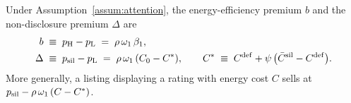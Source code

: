\label{lem:att_prices}
Under Assumption~\ref{assum:attention}, the energy-efficiency premium $b$ and the non-disclosure premium $\Delta$ are
\begin{align}
    b&\;\equiv\;p_{\rm H}-p_{\rm L}\;=\;\rho\,\omega_1\,\beta_1, \label{eq:b_att}\\
    \Delta&\;\equiv\;p_{\rm sil}-p_{\rm L}\;=\;\rho\,\omega_1\,(C_0-C^*),\qquad C^*\;\equiv\;C^{\rm def}+\psi\,\big(\bar C^{\rm sil}-C^{\rm def}\big). \label{eq:premium_att}
\end{align}
More generally, a listing displaying a rating with energy cost $C$ sells at $p_{\rm sil}-\rho\,\omega_1\,(C-C^*)$.
